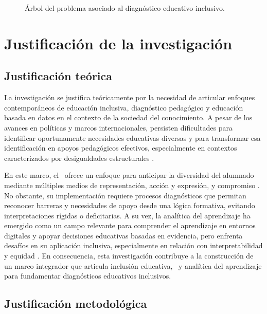 \begin{refsection}
\begin{figure}[htbp]
{}
\caption{Árbol del problema asociado al diagnóstico educativo inclusivo.}
\label{fig:arbol-problema}
\end{figure}

\section{Justificación de la investigación}

\subsection{Justificación teórica}

La investigación se justifica teóricamente por la necesidad de articular enfoques contemporáneos de educación inclusiva, diagnóstico pedagógico y educación basada en datos en el contexto de la sociedad del conocimiento. A pesar de los avances en políticas y marcos internacionales, persisten dificultades para identificar oportunamente necesidades educativas diversas y para transformar esa identificación en apoyos pedagógicos efectivos, especialmente en contextos caracterizados por desigualdades estructurales \parencite{unesco2020}.

En este marco, el \DUA\ ofrece un enfoque para anticipar la diversidad del alumnado mediante múltiples medios de representación, acción y expresión, y compromiso \parencite{cast2018}. No obstante, su implementación requiere procesos diagnósticos que permitan reconocer barreras y necesidades de apoyo desde una lógica formativa, evitando interpretaciones rígidas o deficitarias. A su vez, la analítica del aprendizaje ha emergido como un campo relevante para comprender el aprendizaje en entornos digitales y apoyar decisiones educativas basadas en evidencia, pero enfrenta desafíos en su aplicación inclusiva, especialmente en relación con interpretabilidad y equidad \parencite{siemenslong2011}. En consecuencia, esta investigación contribuye a la construcción de un marco integrador que articula inclusión educativa, \DUA\ y analítica del aprendizaje para fundamentar diagnósticos educativos inclusivos.

\subsection{Justificación metodológica}


\end{refsection}
